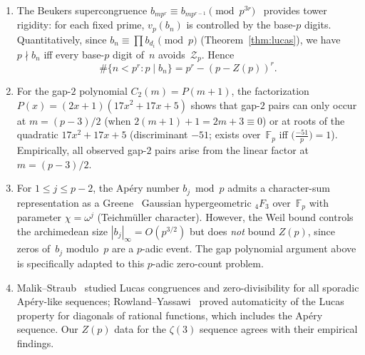\documentclass[11pt]{article}
\theoremstyle{definition}
\theoremstyle{remark}
\begin{document}
\begin{enumerate}
\item The Beukers supercongruence
$b_{mp^r} \equiv b_{mp^{r-1}} \pmod{p^{3r}}$~\cite{Beukers1985}
provides tower rigidity: for each fixed prime,
$v_p(b_n)$ is controlled by the base-$p$ digits.
Quantitatively, since $b_n \equiv \prod b_{d_i} \pmod{p}$
(Theorem~\ref{thm:lucas}), we have $p \nmid b_n$ iff
every base-$p$ digit of~$n$ avoids~$\mathcal{Z}_p$.
Hence
\[
  \#\{n < p^r : p \mid b_n\} = p^r - (p - Z(p))^r.
\]

\item For the gap-$2$ polynomial $C_2(m) = P(m+1)$,
the factorization $P(x) = (2x+1)(17x^2+17x+5)$ shows
that gap-$2$ pairs can only occur at
$m = (p-3)/2$ (when $2(m+1)+1 = 2m+3 \equiv 0$)
or at roots of the quadratic $17x^2+17x+5$
(discriminant $-51$; exists over~$\mathbb{F}_p$
iff $\bigl(\frac{-51}{p}\bigr) = 1$).
Empirically, all observed gap-$2$ pairs arise
from the linear factor at $m = (p-3)/2$.

\item For $1 \le j \le p - 2$, the Ap\'ery number $b_j \bmod p$
      admits a character-sum representation as a
      Greene~\cite{Greene1987} Gaussian hypergeometric
      ${}_4F_3$ over~$\mathbb{F}_p$ with parameter
      $\chi = \omega^j$ (Teichm\"uller character).
      However, the Weil bound controls the archimedean
      size $|b_j|_\infty = O(p^{3/2})$ but does
      \emph{not} bound $Z(p)$, since zeros of~$b_j$
      modulo~$p$ are a $p$-adic event. The gap polynomial
      argument above is specifically adapted to this
      $p$-adic zero-count problem.

\item Malik--Straub~\cite{MalikStraub2016} studied
Lucas congruences and zero-divisibility for all sporadic
Ap\'ery-like sequences;
Rowland--Yassawi~\cite{RowlandYassawi2015} proved
automaticity of the Lucas property for diagonals of
rational functions, which includes the Ap\'ery sequence.
Our $Z(p)$ data for the $\zeta(3)$
sequence agrees with their empirical findings.


\end{enumerate}
\end{document}
